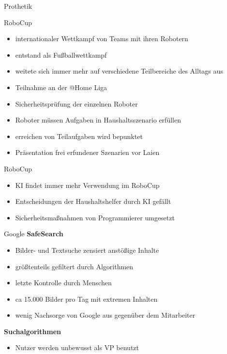 \documentclass[10pt]{beamer}
\begin{document}
	\begin{frame}{Prothetik}
	
	\end{frame}
		
		\begin{frame}{RoboCup}
			\begin{itemize}
				\item internationaler Wettkampf von Teams mit ihren Robotern
				\item entstand als Fußballwettkampf
				\item weitete sich immer mehr auf verschiedene Teilbereiche des Alltags aus
				\item Teilnahme an der @Home Liga
				\item Sicherheitsprüfung der einzelnen Roboter
				\item Roboter müssen Aufgaben in Haushaltsszenario erfüllen
				\item erreichen von Teilaufgaben wird bepunktet
				\item Präsentation frei erfundener Szenarien vor Laien 
			\end{itemize}
		\end{frame}
			\begin{frame}{RoboCup}
				\begin{itemize}
					\item KI findet immer mehr Verwendung im RoboCup
					\item Entscheidungen der Haushaltshelfer durch KI gefällt
					\item Sicherheitsmaßnahmen von Programmierer umgesetzt
				\end{itemize}
			\end{frame}
			\begin{frame}{Google}
				\textbf{SafeSearch}
				\begin{itemize}
					\item Bilder- und Textsuche zensiert anstößige Inhalte
					\item größtenteils gefiltert durch Algorithmen
					\item letzte Kontrolle durch Menschen
					\item ca 15.000 Bilder pro Tag mit extremen Inhalten
					\item wenig Nachsorge von Google aus gegenüber dem Mitarbeiter
				\end{itemize}
				\textbf{Suchalgorithmen}
				\begin{itemize}
					\item Nutzer werden unbewusst als VP benutzt
				\end{itemize}
			\end{frame}
	
\end{document}
